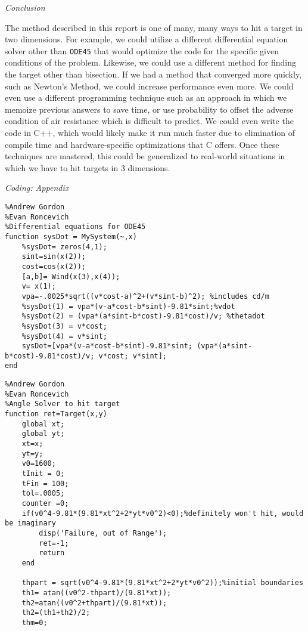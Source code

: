 \documentclass[12pt]{article}
\begin{document}
\begin{enumerate}
\large{\item\textit{Conclusion}}

\normalsize{The method described in this report is one of many, many ways to hit a target in two dimensions.  For example, we could utilize a different differential equation solver other than \texttt{ODE45} that would optimize the code for the specific given conditions of the problem.  Likewise, we could use a different method for finding the target other than bisection.  If we had a method that converged more quickly, such as Newton's Method, we could increase performance even more.  We could even use a different programming technique such as an approach in which we memoize previous answers to save time, or use probability to offset the adverse condition of air resistance which is difficult to predict.  We could even write the code in C++, which would likely make it run much faster due to elimination of compile time and hardware-specific optimizations that C offers.  Once these techniques are mastered, this could be generalized to real-world situations in which we have to hit targets in 3 dimensions.}

\newpage
\large{\item\textit{Coding: Appendix}}
\begin{verbatim}
%Andrew Gordon
%Evan Roncevich
%Differential equations for ODE45
function sysDot = MySystem(~,x)
    %sysDot= zeros(4,1);
    sint=sin(x(2));
    cost=cos(x(2));
    [a,b]= Wind(x(3),x(4));
    v= x(1);
    vpa=-.0025*sqrt((v*cost-a)^2+(v*sint-b)^2); %includes cd/m
    %sysDot(1) = vpa*(v-a*cost-b*sint)-9.81*sint;%vdot
    %sysDot(2) = (vpa*(a*sint-b*cost)-9.81*cost)/v; %thetadot
    %sysDot(3) = v*cost;
    %sysDot(4) = v*sint;
    sysDot=[vpa*(v-a*cost-b*sint)-9.81*sint; (vpa*(a*sint-b*cost)-9.81*cost)/v; v*cost; v*sint];
end
\end{verbatim}
\hrulefill

\begin{verbatim}
%Andrew Gordon
%Evan Roncevich
%Angle Solver to hit target
function ret=Target(x,y)
    global xt;
    global yt;
    xt=x;
    yt=y;    
    v0=1600;    
    tInit = 0;
    tFin = 100;
    tol=.0005;
    counter =0;
    if(v0^4-9.81*(9.81*xt^2+2*yt*v0^2)<0);%definitely won't hit, would be imaginary
        disp('Failure, out of Range');
        ret=-1;
        return
    end
    
    thpart = sqrt(v0^4-9.81*(9.81*xt^2+2*yt*v0^2));%initial boundaries
    th1= atan((v0^2-thpart)/(9.81*xt));
    th2=atan((v0^2+thpart)/(9.81*xt));
    th2=(th1+th2)/2;
    thm=0;
    

\end{verbatim}
\end{enumerate}
\end{document}
